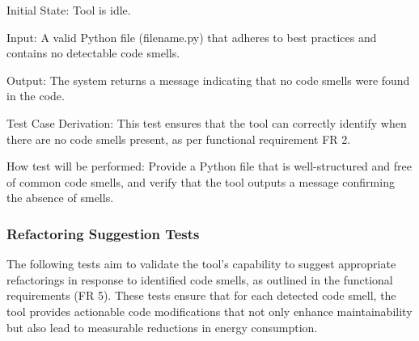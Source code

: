 \documentclass[12pt, titlepage]{article}
\begin{document}
\begin{enumerate}
Initial State: Tool is idle.

Input: A valid Python file (filename.py) that adheres to best practices and contains no detectable code smells.

Output: The system returns a message indicating that no code smells were found in the code.

Test Case Derivation: This test ensures that the tool can correctly identify when there are no code smells present, as per functional requirement FR 2.

How test will be performed: Provide a Python file that is well-structured and free of common code smells, and verify that the tool outputs a message confirming the absence of smells.

\end{enumerate}

\subsubsection{Refactoring Suggestion Tests}

The following tests aim to validate the tool's capability to suggest appropriate refactorings in response to identified code smells, as outlined in the functional requirements (FR 5). These tests ensure that for each detected code smell, the tool provides actionable code modifications that not only enhance maintainability but also lead to measurable reductions in energy consumption.
		
\end{document}
